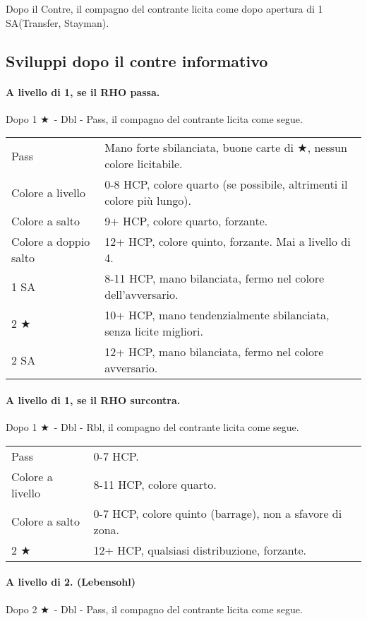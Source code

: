 \documentclass[a4paper,10pt]{article}
\renewcommand{\j}{$\bigstar$\xspace}
\newcommand{\sa}{SA\xspace}
\newcommand{\smallspace}{\vskip0.3cm}
\newenvironment{twocol}
  {\smallspace\noindent\begin{tabular}{l p{0.78\textwidth}}}
  {\end{tabular}\smallspace}
\begin{document}
Dopo il Contre, il compagno del contrante licita come dopo apertura di 1 \sa (Transfer, Stayman).


\subsection{Sviluppi dopo il contre informativo}

\paragraph{A livello di 1, se il RHO passa.} Dopo 1 \j\ - Dbl - Pass, il compagno del contrante licita come segue.

\begin{twocol}
	Pass & Mano forte sbilanciata, buone carte di \j, nessun colore licitabile. \\
	Colore a livello & 0-8 HCP, colore quarto (se possibile, altrimenti il colore più lungo). \\
	Colore a salto & 9+ HCP, colore quarto, forzante. \\
	Colore a doppio salto & 12+ HCP, colore quinto, forzante. Mai a livello di 4. \\
	1 \sa & 8-11 HCP, mano bilanciata, fermo nel colore dell'avversario. \\
	2 \j & 10+ HCP, mano tendenzialmente sbilanciata, senza licite migliori. \\
	2 \sa & 12+ HCP, mano bilanciata, fermo nel colore avversario. \\
\end{twocol}

\paragraph{A livello di 1, se il RHO surcontra.} Dopo 1 \j\ - Dbl - Rbl, il compagno del contrante licita come segue.

\begin{twocol}
	Pass & 0-7 HCP. \\
	Colore a livello & 8-11 HCP, colore quarto. \\
	Colore a salto & 0-7 HCP, colore quinto (barrage), non a sfavore di zona. \\
	2 \j & 12+ HCP, qualsiasi distribuzione, forzante. \\
\end{twocol}

\paragraph{A livello di 2. (Lebensohl)} Dopo 2 \j\ - Dbl - Pass, il compagno del contrante licita come segue.
\end{document}
